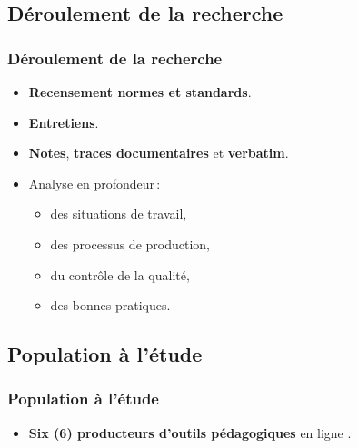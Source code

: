                        	\subsection{Déroulement de la recherche} 
					\begin{frame}[allowframebreaks]
						\frametitle{Déroulement de la recherche}
                        
                        			\begin{itemize} 
                       				 \item \textbf{Recensement normes et standards}.
                       				 \item \textbf{Entretiens}.
                       				 \item \textbf{Notes}, \textbf{traces documentaires} et \textbf{verbatim}.
                       				 \item Analyse en profondeur\,:
                       				 \begin{itemize} 
                       				 	\item des situations de travail, 
                       				 	\item des processus de production,
                       				 	\item du contrôle de la qualité,
                       				 	\item des bonnes pratiques.
                       				 \end{itemize}
                       		 \end{itemize}

             
                \end{frame}
                     	\subsection{Population à l’étude} 
					\begin{frame}[allowframebreaks]
						\frametitle{Population à l’étude}
                        
                        			\begin{itemize} 
                       				 \item \textbf{Six (6) producteurs d’outils pédagogiques }en ligne .										 			\end{itemize}
                       		 
                       		 \end{frame}
